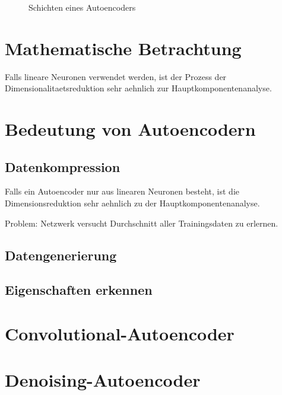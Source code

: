 \begin{figure}[h!]
  \label{fi:nn_layers}
  \caption{Schichten eines Autoencoders}
\end{figure}

\section{Mathematische Betrachtung}
Falls lineare Neuronen verwendet werden, ist der Prozess der
Dimensionalitaetsreduktion sehr aehnlich zur Hauptkomponentenanalyse.


\section{Bedeutung von Autoencodern}
\subsection{Datenkompression}
Falls ein Autoencoder nur aus linearen Neuronen besteht, ist die
Dimensionsreduktion sehr aehnlich zu der Hauptkomponentenanalyse.

Problem: Netzwerk versucht Durchschnitt aller Trainingsdaten zu erlernen.
\subsection{Datengenerierung}
\subsection{Eigenschaften erkennen}

\section{Convolutional-Autoencoder}

\section{Denoising-Autoencoder}


